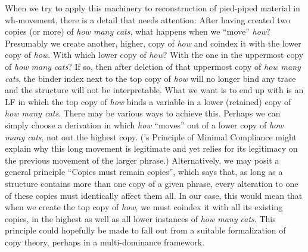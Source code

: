When we try to apply this machinery to reconstruction of pied-piped material in
wh-movement, there is a detail that needs attention: After having created two
copies (or more) of \emph{how many cats}, what happens when we ``move''
\emph{how}? Presumably we create another, higher, copy of \emph{how} and coindex
it with the lower copy of \emph{how}. With which lower copy of \emph{how}? With
the one in the uppermost copy of \emph{how many cats}? If so, then after
deletion of that uppermost copy of \emph{how many cats}, the binder index next
to the top copy of \emph{how} will no longer bind any trace and the structure
will not be interpretable. What we want is to end up with is an LF in which the
top copy of \emph{how} binds a variable in a lower (retained) copy of \emph{how
  many cats}. There may be various ways to achieve this. Perhaps we can simply
choose a derivation in which \emph{how} ``moves'' out of a lower copy of
\emph{how many cats}, not out the highest copy.
(\cite{richards-1998-PrincipleMinimalCompliance}'s Principle of Minimal
Compliance might explain why this long movement is legitimate and yet relies for
its legitimacy on the previous movement of the larger phrase.) Alternatively, we
may posit a general principle ``Copies must remain copies'', which says that, as
long as a structure contains more than one copy of a given phrase, every
alteration to one of these copies must identically affect them all. In our case,
this would mean that when we create the top copy of \emph{how}, we must coindex
it with all its existing copies, in the highest as well as all lower instances
of \emph{how many cats}. This principle could hopefully be made to fall out from
a suitable formalization of copy theory, perhaps in a multi-dominance framework.




